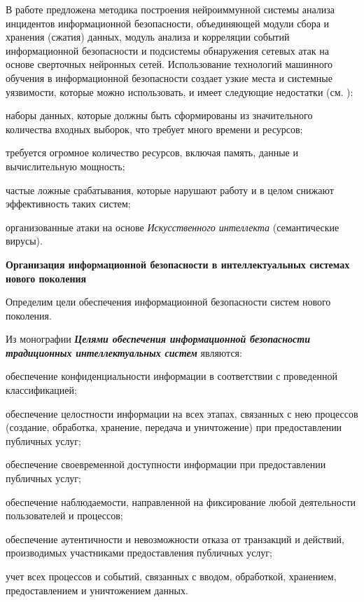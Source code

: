В работе  предложена методика построения нейроиммунной системы анализа инцидентов информационной безопасности, объединяющей модули сбора и хранения (сжатия) данных, модуль анализа и корреляции событий информационной безопасности и подсистемы обнаружения сетевых атак на основе сверточных нейронных сетей. Использование технологий машинного обучения в информационной безопасности создает узкие места и системные уязвимости, которые можно использовать, и имеет следующие недостатки (см. ):

\begin{textitemize}
	\item наборы данных, которые должны быть сформированы из значительного количества входных выборок, что требует много времени и ресурсов;
	\item требуется огромное количество ресурсов, включая память, данные и вычислительную мощность;
	\item частые ложные срабатывания, которые нарушают работу и в целом снижают эффективность таких систем;
	\item организованные атаки на основе \textit{Искусственного интеллекта} (семантические вирусы).
\end{textitemize}

\textbf{Организация информационной безопасности в интеллектуальных системах нового поколения}

Определим цели обеспечения информационной безопасности систем нового поколения.

Из монографии  \textbf{\textit{Целями обеспечения информационной безопасности традиционных интеллектуальных систем}} являются:

\begin{textitemize}
	\item обеспечение конфиденциальности информации в соответствии с проведенной классификацией;
	\item обеспечение целостности информации на всех этапах, связанных с нею процессов (создание, обработка, хранение, передача и уничтожение) при предоставлении публичных услуг;
	\item обеспечение своевременной доступности информации при предоставлении публичных услуг;
	\item обеспечение наблюдаемости, направленной на фиксирование любой деятельности пользователей и процессов;
	\item обеспечение аутентичности и невозможности отказа от транзакций и действий, производимых участниками предоставления публичных услуг;
	\item учет всех процессов и событий, связанных с вводом, обработкой, хранением, предоставлением и уничтожением данных.
\end{textitemize}

